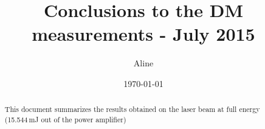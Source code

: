 \documentclass[10pt,a4paper]{article}
\title{Conclusions to the DM measurements - July 2015}
\author{Aline}
\date{\today}
\begin{document}
\maketitle

\begin{abstract}
This document summarizes the results obtained on the laser beam at full energy (15.544$\,$mJ out of the power amplifier)
\end{abstract}
\end{document}

